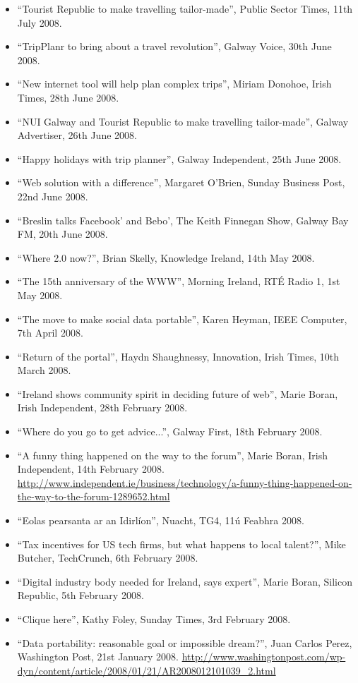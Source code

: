 \documentclass[10pt,a4paper]{res} %
\begin{document}
\begin{resume}
{\begin{itemize}
\item ``Tourist Republic to make travelling tailor-made'', Public Sector Times, 11th July 2008.
\item ``TripPlanr to bring about a travel revolution'', Galway Voice, 30th June 2008.
\item ``New internet tool will help plan complex trips'', Miriam Donohoe, Irish Times, 28th June 2008.
\item ``NUI Galway and Tourist Republic to make travelling tailor-made'', Galway Advertiser, 26th June 2008.
\item ``Happy holidays with trip planner'', Galway Independent, 25th June 2008.
\item ``Web solution with a difference'', Margaret O'Brien, Sunday Business Post, 22nd June 2008.
\item ``Breslin talks Facebook' and Bebo', The Keith Finnegan Show, Galway Bay FM, 20th June 2008.
\item ``Where 2.0 now?'', Brian Skelly, Knowledge Ireland, 14th May 2008.
\item ``The 15th anniversary of the WWW'', Morning Ireland, RT\'{E} Radio 1, 1st May 2008.
\item ``The move to make social data portable'', Karen Heyman, IEEE Computer, 7th April 2008.
\item ``Return of the portal'', Haydn Shaughnessy, Innovation, Irish Times, 10th March 2008.
\item ``Ireland shows community spirit in deciding future of web'', Marie Boran, Irish Independent, 28th February 2008.
\item ``Where do you go to get advice...'', Galway First, 18th February 2008.
\item ``A funny thing happened on the way to the forum'', Marie Boran, Irish Independent, 14th February 2008. \url{http://www.independent.ie/business/technology/a-funny-thing-happened-on-the-way-to-the-forum-1289652.html}
\item ``Eolas pearsanta ar an Idirl\'{i}on'', Nuacht, TG4, 11\'{u} Feabhra 2008.
\item ``Tax incentives for US tech firms, but what happens to local talent?'', Mike Butcher, TechCrunch, 6th February 2008.
\item ``Digital industry body needed for Ireland, says expert'', Marie Boran, Silicon Republic, 5th February 2008.
\item ``Clique here'', Kathy Foley, Sunday Times, 3rd February 2008.
\item ``Data portability: reasonable goal or impossible dream?'', Juan Carlos Perez, Washington Post, 21st January 2008. \url{http://www.washingtonpost.com/wp-dyn/content/article/2008/01/21/AR2008012101039_2.html}

\end{itemize}}
\end{resume}
\end{document}
